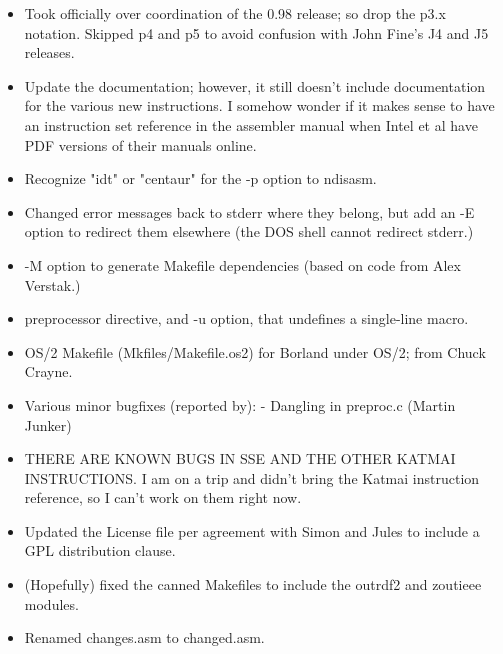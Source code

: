 
\begin{itemize}
    \item{Took officially over coordination of the 0.98 release; so drop
        the p3.x notation. Skipped p4 and p5 to avoid confusion with John
        Fine's J4 and J5 releases.}
    \item{Update the documentation; however, it still doesn't include
        documentation for the various new instructions. I somehow wonder if
        it makes sense to have an instruction set reference in the assembler
        manual when Intel et al have PDF versions of their manuals online.}
    \item{Recognize "idt" or "centaur" for the -p option to ndisasm.}
    \item{Changed error messages back to stderr where they belong, but add an
        -E option to redirect them elsewhere (the DOS shell cannot redirect
        stderr.)}
    \item{-M option to generate Makefile dependencies (based on code from Alex Verstak.)}
    \item{ preprocessor directive, and -u option, that undefines a
        single-line macro.}
    \item{OS/2 Makefile (Mkfiles/Makefile.os2) for Borland under OS/2; from
        Chuck Crayne.}
    \item{Various minor bugfixes (reported by):
        - Dangling  in preproc.c (Martin Junker)}
    \item{THERE ARE KNOWN BUGS IN SSE AND THE OTHER KATMAI INSTRUCTIONS. I am
        on a trip and didn't bring the Katmai instruction reference, so I
        can't work on them right now.}
    \item{Updated the License file per agreement with Simon and Jules to
        include a GPL distribution clause.}
\end{itemize}


\begin{itemize}
    \item{(Hopefully) fixed the canned Makefiles to include the outrdf2 and
        zoutieee modules.}
    \item{Renamed changes.asm to changed.asm.}
\end{itemize}


